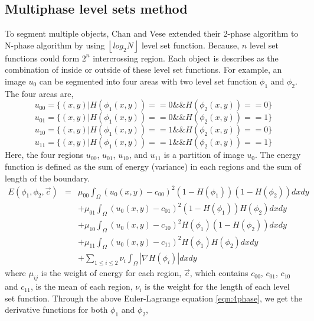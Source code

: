 \subsection{Multiphase level sets method}
To segment multiple objects, Chan and Vese extended their 2-phase algorithm to N-phase algorithm by using $\left \lfloor log_2N \right \rfloor$ level set function. Because, $n$ level set functions could form $2^n$ intercrossing region. Each object is describes as the combination of inside or outside of these level set functions. For example, an image $u_0$ can be segmented into four areas with two level set function $\phi_1$ and $\phi_2$. The four areas are,
\begin{equation}
u_{00} = \{(x,y) | H(\phi_1(x,y)) == 0 \&\& H(\phi_2(x,y)) == 0\}
\end{equation}
\begin{equation}
u_{01} = \{(x,y) | H(\phi_1(x,y)) == 0 \&\& H(\phi_2(x,y)) == 1\}
\end{equation}
\begin{equation}
u_{10} = \{(x,y) | H(\phi_1(x,y)) == 1 \&\& H(\phi_2(x,y)) == 0\}
\end{equation}
\begin{equation}
u_{11} = \{(x,y) | H(\phi_1(x,y)) == 1 \&\& H(\phi_2(x,y)) == 1\} 
\end{equation}
Here, the four regions $u_{00}$, $u_{01}$, $u_{10}$, and $u_{11}$ is a partition of image $u_0$. The energy function is defined as the sum of energy (variance) in each regions and the sum of length of the boundary.
\begin{eqnarray}
\nonumber
E(\phi_1,\phi_2, \vec{c}) & = & \mu_{00}\int_{\Omega}(u_0(x,y) - c_{00})^2(1-H(\phi_1))(1-H(\phi_2))dxdy \\
\nonumber
& & + \mu_{01}\int_{\Omega}(u_0(x,y) - c_{01})^2(1-H(\phi_1))H(\phi_2)dxdy \\
\label{eqn:4phase}
& & + \mu_{10}\int_{\Omega}(u_0(x,y) - c_{10})^2H(\phi_1)(1-H(\phi_2))dxdy \\
\nonumber
& & + \mu_{11}\int_{\Omega}(u_0(x,y) - c_{11})^2H(\phi_1)H(\phi_2)dxdy \\
\nonumber
& & + \sum_{1 \le i \le 2}\nu_i\int_{\Omega}|\nabla H(\phi_i)|dxdy
\end{eqnarray}
where $\mu_{ij}$ is the weight of energy for each region, $\vec{c}$, which contains $c_{00}$, $c_{01}$, $c_{10}$ and $c_{11}$, is the mean of each region, $\nu_i$ is the weight for the length of each level set function. Through the above Euler-Lagrange equation \ref{eqn:4phase}, we get the derivative functions for both $\phi_1$ and $\phi_2$, 
